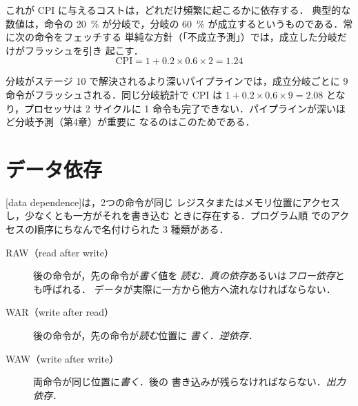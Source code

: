 \documentclass[../main.tex]{subfiles}
\begin{document}
これが CPI に与えるコストは，どれだけ頻繁に起こるかに依存する．
典型的な
数値は，命令の \SI{20}{\percent} が分岐で，分岐の
\SI{60}{\percent} が成立するというものである．常に次の命令をフェッチする
単純な方針（「不成立予測」）では，成立した分岐だけがフラッシュを引き
起こす．
\begin{equation}
  \text{CPI} = 1 + 0.2 \times 0.6 \times 2 = 1.24
  \label{eq:branch-cpi}
\end{equation}

\begin{example}
  分岐がステージ 10 で解決されるより深いパイプラインでは，成立分岐ごとに
  9 命令がフラッシュされる．同じ分岐統計で CPI は
  $1 + 0.2\times 0.6\times 9 = 2.08$ となり，プロセッサは 2 サイクルに
  1 命令も完了できない．パイプラインが深いほど分岐予測（第4章）が重要に
  なるのはこのためである．
\end{example}


\section{データ依存}

[data dependence]は，2つの命令が同じ
レジスタまたはメモリ位置にアクセスし，少なくとも一方がそれを書き込む
ときに存在する．プログラム順
でのアクセスの順序にちなんで名付けられた 3 種類がある．

\begin{description}
  \item[RAW（read after write）]%
    後の命令が，先の命令が\emph{書く}値を
    \emph{読む}．\emph{真の依存}あるいは\emph{フロー依存}とも呼ばれる．
    データが実際に一方から他方へ流れなければならない．
  \item[WAR（write after read）]%
    後の命令が，先の命令が\emph{読む}位置に
    \emph{書く}．\emph{逆依存}．
  \item[WAW（write after write）]%
    両命令が同じ位置に\emph{書く}．後の
    書き込みが残らなければならない．\emph{出力依存}．
\end{description}
\end{document}
